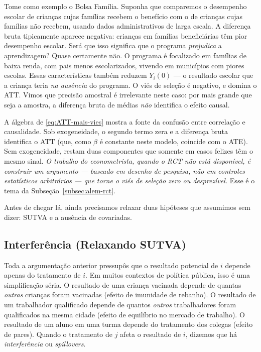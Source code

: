 Tome como exemplo o Bolsa Família. Suponha que comparemos o desempenho escolar de crianças cujas famílias recebem o benefício com o de crianças cujas famílias não recebem, usando dados administrativos de larga escala. A diferença bruta tipicamente aparece negativa: crianças em famílias beneficiárias têm pior desempenho escolar. Será que isso significa que o programa \textit{prejudica} a aprendizagem? Quase certamente não. O programa é focalizado em famílias de baixa renda, com pais menos escolarizados, vivendo em municípios com piores escolas. Essas características também reduzem $Y_i(0)$ --- o resultado escolar que a criança teria \textit{na ausência} do programa. O viés de seleção é negativo, e domina o ATT. Vimos que precisão amostral é irrelevante neste caso: por mais grande que seja a amostra, a diferença bruta de médias \textit{não} identifica o efeito causal.

A álgebra de \eqref{eq:ATT-mais-vies} mostra a fonte da confusão entre correlação e causalidade. Sob exogeneidade, o segundo termo zera e a diferença bruta identifica o ATT (que, como $\beta$ é constante neste modelo, coincide com o ATE). Sem exogeneidade, restam duas componentes que somente em casos felizes têm o mesmo sinal. \textit{O trabalho do econometrista, quando o RCT não está disponível, é construir um argumento --- baseado em desenho de pesquisa, não em controles estatísticos arbitrários --- que torne o viés de seleção zero ou desprezível.} Esse é o tema da Subseção~\ref{subsec:alem-rct}.

Antes de chegar lá, ainda precisamos relaxar duas hipóteses que assumimos sem dizer: SUTVA e a ausência de covariadas.

\subsection{Interferência (Relaxando SUTVA)}
\label{subsec:interferencia}

Toda a argumentação anterior pressupôs que o resultado potencial de $i$ depende apenas do tratamento de $i$. Em muitos contextos de política pública, isso é uma simplificação séria. O resultado de uma criança vacinada depende de quantas \textit{outras} crianças foram vacinadas (efeito de imunidade de rebanho). O resultado de um trabalhador qualificado depende de quantos \textit{outros} trabalhadores foram qualificados na mesma cidade (efeito de equilíbrio no mercado de trabalho). O resultado de um aluno em uma turma depende do tratamento dos colegas (efeito de pares). Quando o tratamento de $j$ afeta o resultado de $i$, dizemos que há \textit{interferência} ou \textit{spillovers}.

